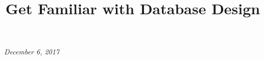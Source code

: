 \documentclass[12p]{article}
\title{Get Familiar with Database Design}
\date{\vspace{-12ex}}
\theoremstyle{definition}
\begin{document}
\maketitle
\thispagestyle{fancy}

\onehalfspacing

\begin{center}
  \textit{December 6, 2017}
\end{center}
\end{document}
